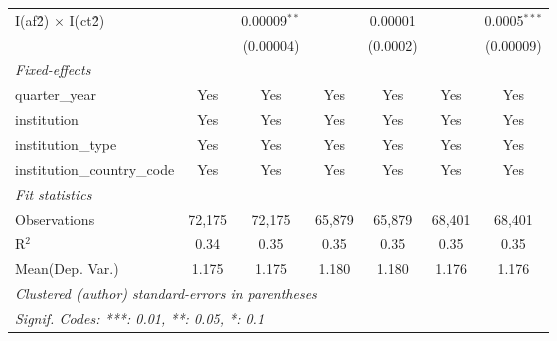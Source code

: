 \begin{tabular}{lcccccc}
   I(af\^2) $\times$ I(ct\^2)         &               & 0.00009$^{**}$ &               & 0.00001        &               & 0.0005$^{***}$\\   
                                      &               & (0.00004)      &               & (0.0002)       &               & (0.00009)\\   
   \midrule
   \emph{Fixed-effects}\\
   quarter\_year                      & Yes           & Yes            & Yes           & Yes            & Yes           & Yes\\  
   institution                        & Yes           & Yes            & Yes           & Yes            & Yes           & Yes\\  
   institution\_type                  & Yes           & Yes            & Yes           & Yes            & Yes           & Yes\\  
   institution\_country\_code         & Yes           & Yes            & Yes           & Yes            & Yes           & Yes\\  
   \midrule
   \emph{Fit statistics}\\
   Observations                       & 72,175        & 72,175         & 65,879        & 65,879         & 68,401        & 68,401\\  
   R$^2$                              & 0.34          & 0.35           & 0.35          & 0.35           & 0.35          & 0.35\\  
Mean(Dep. Var.) & 1.175 & 1.175 & 1.180 & 1.180 & 1.176 & 1.176 \\
   \midrule \midrule
   \multicolumn{7}{l}{\emph{Clustered (author) standard-errors in parentheses}}\\
   \multicolumn{7}{l}{\emph{Signif. Codes: ***: 0.01, **: 0.05, *: 0.1}}\\
\end{tabular}
\par\endgroup
